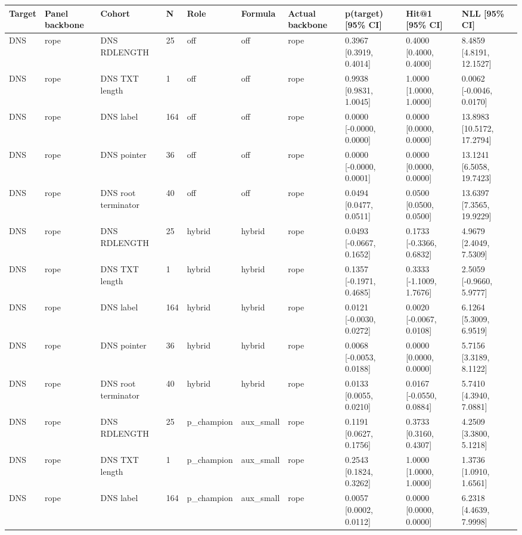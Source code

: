 \begin{tabular}{llllllllll}
\hline
Target & Panel backbone & Cohort & N & Role & Formula & Actual backbone & p(target) [95\% CI] & Hit@1 [95\% CI] & NLL [95\% CI] \\
\hline
DNS & rope & DNS RDLENGTH & 25 & off & off & rope & 0.3967 [0.3919, 0.4014] & 0.4000 [0.4000, 0.4000] & 8.4859 [4.8191, 12.1527] \\
DNS & rope & DNS TXT length & 1 & off & off & rope & 0.9938 [0.9831, 1.0045] & 1.0000 [1.0000, 1.0000] & 0.0062 [-0.0046, 0.0170] \\
DNS & rope & DNS label & 164 & off & off & rope & 0.0000 [-0.0000, 0.0000] & 0.0000 [0.0000, 0.0000] & 13.8983 [10.5172, 17.2794] \\
DNS & rope & DNS pointer & 36 & off & off & rope & 0.0000 [-0.0000, 0.0001] & 0.0000 [0.0000, 0.0000] & 13.1241 [6.5058, 19.7423] \\
DNS & rope & DNS root terminator & 40 & off & off & rope & 0.0494 [0.0477, 0.0511] & 0.0500 [0.0500, 0.0500] & 13.6397 [7.3565, 19.9229] \\
DNS & rope & DNS RDLENGTH & 25 & hybrid & hybrid & rope & 0.0493 [-0.0667, 0.1652] & 0.1733 [-0.3366, 0.6832] & 4.9679 [2.4049, 7.5309] \\
DNS & rope & DNS TXT length & 1 & hybrid & hybrid & rope & 0.1357 [-0.1971, 0.4685] & 0.3333 [-1.1009, 1.7676] & 2.5059 [-0.9660, 5.9777] \\
DNS & rope & DNS label & 164 & hybrid & hybrid & rope & 0.0121 [-0.0030, 0.0272] & 0.0020 [-0.0067, 0.0108] & 6.1264 [5.3009, 6.9519] \\
DNS & rope & DNS pointer & 36 & hybrid & hybrid & rope & 0.0068 [-0.0053, 0.0188] & 0.0000 [0.0000, 0.0000] & 5.7156 [3.3189, 8.1122] \\
DNS & rope & DNS root terminator & 40 & hybrid & hybrid & rope & 0.0133 [0.0055, 0.0210] & 0.0167 [-0.0550, 0.0884] & 5.7410 [4.3940, 7.0881] \\
DNS & rope & DNS RDLENGTH & 25 & p\_champion & aux\_small & rope & 0.1191 [0.0627, 0.1756] & 0.3733 [0.3160, 0.4307] & 4.2509 [3.3800, 5.1218] \\
DNS & rope & DNS TXT length & 1 & p\_champion & aux\_small & rope & 0.2543 [0.1824, 0.3262] & 1.0000 [1.0000, 1.0000] & 1.3736 [1.0910, 1.6561] \\
DNS & rope & DNS label & 164 & p\_champion & aux\_small & rope & 0.0057 [0.0002, 0.0112] & 0.0000 [0.0000, 0.0000] & 6.2318 [4.4639, 7.9998] \\

\end{tabular}
